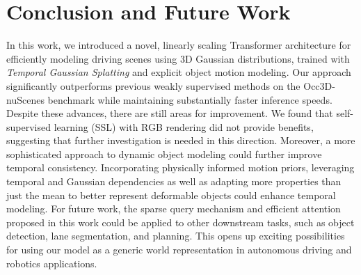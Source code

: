 \documentclass[10pt,twocolumn,letterpaper]{article}
\begin{document}
\section{Conclusion and Future Work} \label{sec:conclusion}
In this work, we introduced a novel, linearly scaling Transformer architecture for efficiently modeling driving scenes using 3D Gaussian distributions, trained with \emph{Temporal Gaussian Splatting} and explicit object motion modeling.
Our approach significantly outperforms previous weakly supervised methods on the Occ3D-nuScenes benchmark while maintaining substantially faster inference speeds.
Despite these advances, there are still areas for improvement.
We found that self-supervised learning (SSL) with RGB rendering did not provide benefits, suggesting that further investigation is needed in this direction.
Moreover, a more sophisticated approach to dynamic object modeling could further improve temporal consistency.
Incorporating physically informed motion priors, leveraging temporal and Gaussian dependencies as well as adapting more properties than just the mean to better represent deformable objects could enhance temporal modeling.
For future work, the sparse query mechanism and efficient attention proposed in this work could be applied to other downstream tasks, such as object detection, lane segmentation, and planning. 
This opens up exciting possibilities for using our model as a generic world representation in autonomous driving and robotics applications.

{
    \small
    
    
}
 

\end{document}

